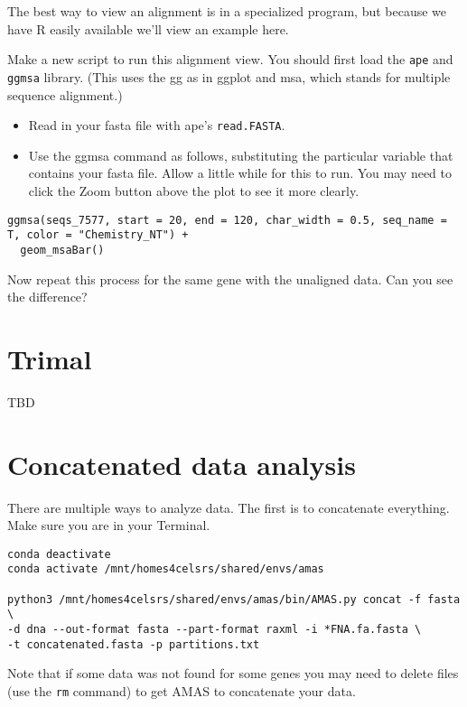 \documentclass[
]{book}
\providecommand{\tightlist}{%
  \setlength{\itemsep}{0pt}\setlength{\parskip}{0pt}}
\begin{document}
The best way to view an alignment is in a specialized program, but because we have R
easily available we'll view an example here.

Make a new script to run this alignment view.
You should first load the \texttt{ape} and \texttt{ggmsa} library. (This uses the gg as in ggplot and msa, which stands for multiple sequence alignment.)

\begin{itemize}
\tightlist
\item
  Read in your fasta file with ape's \texttt{read.FASTA}.
\item
  Use the ggmsa command as follows, substituting the particular variable that contains your fasta file. Allow a little while for this to run. You may need to click the Zoom button above the plot to see it more clearly.
\end{itemize}

\begin{verbatim}
ggmsa(seqs_7577, start = 20, end = 120, char_width = 0.5, seq_name = T, color = "Chemistry_NT") +
  geom_msaBar()
\end{verbatim}

Now repeat this process for the same gene with the unaligned data. Can you see the difference?

\hypertarget{trimal}{%
\section{Trimal}\label{trimal}}

TBD

\hypertarget{concatenated-data-analysis}{%
\section{Concatenated data analysis}\label{concatenated-data-analysis}}

There are multiple ways to analyze data.
The first is to concatenate everything.
Make sure you are in your Terminal.

\begin{verbatim}
conda deactivate
conda activate /mnt/homes4celsrs/shared/envs/amas

python3 /mnt/homes4celsrs/shared/envs/amas/bin/AMAS.py concat -f fasta \
-d dna --out-format fasta --part-format raxml -i *FNA.fa.fasta \
-t concatenated.fasta -p partitions.txt
\end{verbatim}

Note that if some data was not found for some genes you may need to delete files (use the \texttt{rm} command) to get AMAS to concatenate your data.
\end{document}
